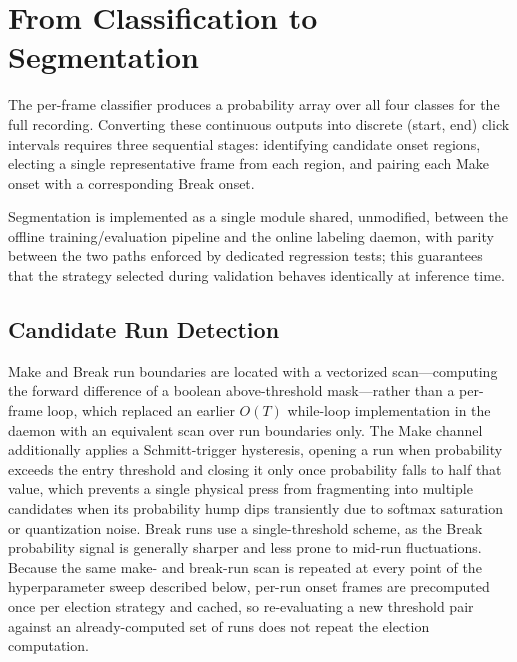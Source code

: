 \section{From Classification to Segmentation}
\label{sec:segmentation_impl}

The per-frame classifier produces a probability array over all four classes for the full recording. Converting these continuous outputs into discrete (start, end) click intervals requires three sequential stages: identifying candidate onset regions, electing a single representative frame from each region, and pairing each Make onset with a corresponding Break onset.

Segmentation is implemented as a single module shared, unmodified, between the offline training/evaluation pipeline and the online labeling daemon, with parity between the two paths enforced by dedicated regression tests; this guarantees that the strategy selected during validation behaves identically at inference time.

\subsection{Candidate Run Detection}
Make and Break run boundaries are located with a vectorized scan---computing the forward difference of a boolean above-threshold mask---rather than a per-frame loop, which replaced an earlier $O(T)$ while-loop implementation in the daemon with an equivalent scan over run boundaries only. The Make channel additionally applies a Schmitt-trigger hysteresis, opening a run when probability exceeds the entry threshold and closing it only once probability falls to half that value, which prevents a single physical press from fragmenting into multiple candidates when its probability hump dips transiently due to softmax saturation or quantization noise. Break runs use a single-threshold scheme, as the Break probability signal is generally sharper and less prone to mid-run fluctuations. Because the same make- and break-run scan is repeated at every point of the hyperparameter sweep described below, per-run onset frames are precomputed once per election strategy and cached, so re-evaluating a new threshold pair against an already-computed set of runs does not repeat the election computation.

